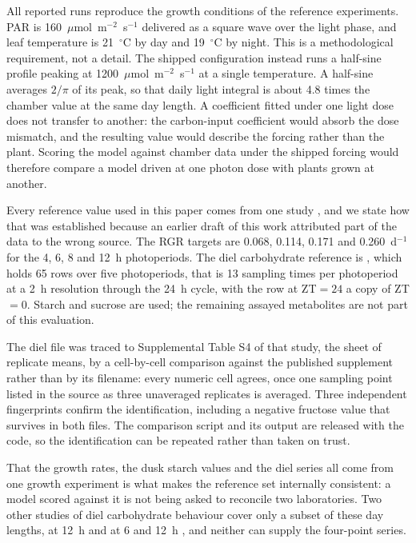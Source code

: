 All reported runs reproduce the growth conditions of the reference experiments.
PAR is 160~$\mu$mol~m$^{-2}$~s$^{-1}$ delivered as a square wave over the light
phase, and leaf temperature is 21~$^\circ$C by day and 19~$^\circ$C by night.
This is a methodological requirement, not a detail. The shipped configuration
instead runs a half-sine profile peaking at
1200~$\mu$mol~m$^{-2}$~s$^{-1}$ at a single temperature. A half-sine averages
$2/\pi$ of its peak, so that daily light integral is about 4.8 times the chamber
value at the same day length. A coefficient fitted under one light dose does not
transfer to another:
the carbon-input coefficient would absorb the dose mismatch, and the resulting
value would describe the forcing rather than the plant. Scoring the model
against chamber data under the shipped forcing would therefore compare a model
driven at one photon dose with plants grown at another.

Every reference value used in this paper comes from one study
\citep{Sulpice2014}, and we state how that was established because an earlier
draft of this work attributed part of the data to the wrong source. The RGR
targets are 0.068, 0.114, 0.171 and 0.260~d$^{-1}$ for the 4, 6, 8 and 12~h
photoperiods. The diel carbohydrate reference is
, which holds 65 rows over five
photoperiods, that is 13 sampling times per photoperiod at a 2~h resolution
through the 24~h cycle, with the row at ZT${}=24$ a copy of ZT${}=0$. Starch and
sucrose are used; the remaining assayed metabolites are not part of this
evaluation.

The diel file was traced to Supplemental Table S4 of that study, the sheet of
replicate means, by a cell-by-cell comparison against the published supplement
rather than by its filename: every numeric cell agrees, once one sampling point
listed in the source as three unaveraged replicates is averaged. Three
independent fingerprints confirm the identification, including a negative
fructose value that survives in both files. The comparison script and its output
are released with the code, so the identification can be repeated rather than
taken on trust.

That the growth rates, the dusk starch values and the diel series all come from
one growth experiment is what makes the reference set internally consistent: a
model scored against it is not being asked to reconcile two laboratories. Two
other studies of diel carbohydrate behaviour cover only a subset of these day
lengths, at 12~h \citep{Annunziata2017} and at 6 and 12~h \citep{Mengin2017}, and
neither can supply the four-point series.



